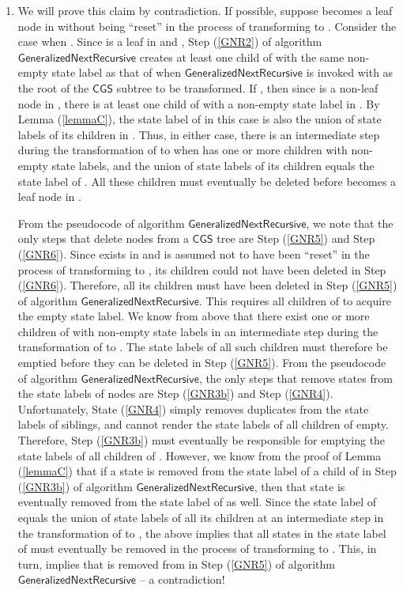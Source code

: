 \documentclass[3p]{elsarticle}
\newcommand{\CGS}{\ensuremath{\textsf{CGS }}}
\newcommand{\algo}[1]{\ensuremath{\textsf{{#1}}}}
\begin{document}
\begin{enumerate}
\item We will prove this claim by contradiction.  If possible, suppose
   becomes a leaf node in  without being ``reset'' in the
  process of transforming  to .  Consider the case when
  .  Since  is a leaf in  and , Step (\ref{GNR2}) of algorithm
  \algo{GeneralizedNextRecursive} creates at least one child of 
  with the same non-empty state label as that of  when
  \algo{GeneralizedNextRecursive} is invoked with  as the root of
  the \CGS subtree to be transformed.  If , then since  is
  a non-leaf node in , there is at least one child of 
  with a non-empty state label in .  By Lemma (\ref{lemmaC}),
  the state label of  in this case is also the union of state
  labels of its children in .  Thus, in either case, there is
  an intermediate step during the transformation of  to 
  when  has one or more children with non-empty state labels, and
  the union of state labels of its children equals the state label of
  .  All these children must eventually be deleted before 
  becomes a leaf node in .

  From the pseudocode of algorithm \algo{GeneralizedNextRecursive}, we
  note that the only steps that delete nodes from a \CGS tree are Step
  (\ref{GNR5}) and Step (\ref{GNR6}).  Since  exists in  and
  is assumed not to have been ``reset'' in the process of transforming
   to , its children could not have been deleted in Step
  (\ref{GNR6}).  Therefore, all its children must have been deleted in
  Step (\ref{GNR5}) of algorithm \algo{GeneralizedNextRecursive}.
  This requires all children of  to acquire the empty state label.
  We know from above that there exist one or more children of  with
  non-empty state labels in an intermediate step during the
  transformation of  to .  The state labels of all such
  children must therefore be emptied before they can be deleted in
  Step (\ref{GNR5}).  From the pseudocode of algorithm
  \algo{GeneralizedNextRecursive}, the only steps that remove states
  from the state labels of nodes are Step (\ref{GNR3b}) and Step
  (\ref{GNR4}).  Unfortunately, State (\ref{GNR4}) simply removes
  duplicates from the state labels of siblings, and cannot render the
  state labels of all children of  empty.  Therefore, Step
  (\ref{GNR3b}) must eventually be responsible for emptying the state
  labels of all children of .  However, we know from the proof of
  Lemma (\ref{lemmaC}) that if a state is removed from the state label
  of a child of  in Step (\ref{GNR3b}) of algorithm
  \algo{GeneralizedNextRecursive}, then that state is eventually
  removed from the state label of  as well.  Since the state label
  of  equals the union of state labels of all its children at an
  intermediate step in the transformation of  to , the
  above implies that all states in the state label of  must
  eventually be removed in the process of transforming  to
  .  This, in turn, implies that  is removed from  in
  Step (\ref{GNR5}) of algorithm \algo{GeneralizedNextRecursive} -- a
  contradiction!


\end{enumerate}
\end{document}
